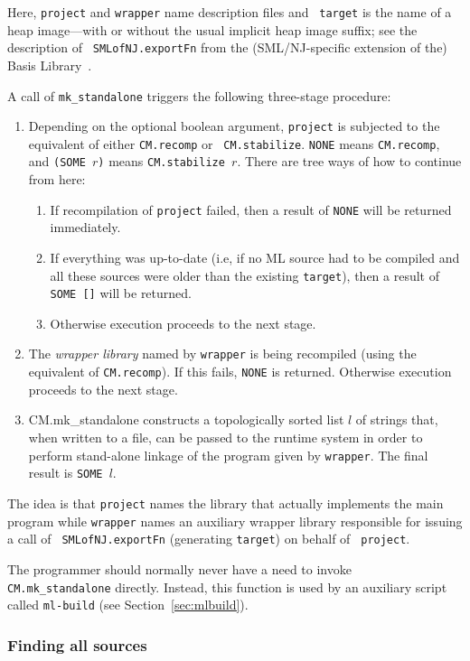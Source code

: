\documentclass[titlepage,letterpaper]{article}
\begin{document}
Here, {\tt project} and {\tt wrapper} name description files and {\tt
target} is the name of a heap image---with or without the usual
implicit heap image suffix; see the description of {\tt
SMLofNJ.exportFn} from the (SML/NJ-specific extension of the) Basis
Library~\cite{reppy99:basis}.

A call of {\tt mk\_standalone} triggers the following three-stage
procedure:
\begin{enumerate}
\item Depending on the optional boolean argument, {\tt project} is
subjected to the equivalent of either {\tt CM.recomp} or {\tt
CM.stabilize}.  {\tt NONE} means {\tt CM.recomp}, and {\tt (SOME $r$)}
means {\tt CM.stabilize $r$}.
There are tree ways of how to continue from here:
\begin{enumerate}
\item If recompilation of {\tt project}
failed, then a result of {\tt NONE} will be returned immediately.
\item If everything was up-to-date (i.e, if no ML source had to be compiled
and all these sources were older than the existing {\tt target}), then
a result of {\tt SOME []} will be returned.
\item Otherwise execution proceeds to the next stage.
\end{enumerate}
\item The {\em wrapper library} named by {\tt wrapper} is being
recompiled (using the equivalent of {\tt CM.recomp}).  If this
fails, {\tt NONE} is returned.  Otherwise execution proceeds to the
next stage.
\item {CM.mk\_standalone} constructs a topologically sorted list $l$
of strings that, when written to a file, can be passed to the runtime
system in order to perform stand-alone linkage of the program given by
{\tt wrapper}.  The final result is {\tt SOME $l$}.
\end{enumerate}

The idea is that {\tt project} names the library that actually
implements the main program while {\tt wrapper} names an auxiliary
wrapper library responsible for issuing a call of {\tt
SMLofNJ.exportFn} (generating {\tt target}) on behalf of {\tt
project}.

The programmer should normally never have a need to invoke {\tt
CM.mk\_standalone} directly.  Instead, this function is used by an
auxiliary script called {\tt ml-build} (see
Section~\ref{sec:mlbuild}).

\subsubsection{Finding all sources}
\label{sec:makedepend:support}
\end{document}
